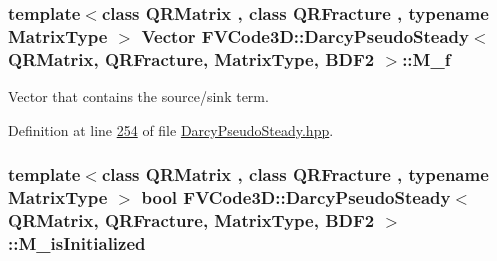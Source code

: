 \subsubsection[{\texorpdfstring{M\+\_\+f}{M_f}}]{\setlength{\rightskip}{0pt plus 5cm}template$<$class Q\+R\+Matrix , class Q\+R\+Fracture , typename Matrix\+Type $>$ {\bf Vector} {\bf F\+V\+Code3\+D\+::\+Darcy\+Pseudo\+Steady}$<$ Q\+R\+Matrix, Q\+R\+Fracture, Matrix\+Type, {\bf B\+D\+F2} $>$\+::M\+\_\+f\hspace{0.3cm}{\ttfamily [protected]}}\hypertarget{classFVCode3D_1_1DarcyPseudoSteady_3_01QRMatrix_00_01QRFracture_00_01MatrixType_00_01BDF2_01_4_a8a75d8bd731f7b15ec65ada8eca3d67e}{}\label{classFVCode3D_1_1DarcyPseudoSteady_3_01QRMatrix_00_01QRFracture_00_01MatrixType_00_01BDF2_01_4_a8a75d8bd731f7b15ec65ada8eca3d67e}


Vector that contains the source/sink term. 



Definition at line \hyperlink{DarcyPseudoSteady_8hpp_source_l00254}{254} of file \hyperlink{DarcyPseudoSteady_8hpp_source}{Darcy\+Pseudo\+Steady.\+hpp}.

\subsubsection[{\texorpdfstring{M\+\_\+is\+Initialized}{M_isInitialized}}]{\setlength{\rightskip}{0pt plus 5cm}template$<$class Q\+R\+Matrix , class Q\+R\+Fracture , typename Matrix\+Type $>$ bool {\bf F\+V\+Code3\+D\+::\+Darcy\+Pseudo\+Steady}$<$ Q\+R\+Matrix, Q\+R\+Fracture, Matrix\+Type, {\bf B\+D\+F2} $>$\+::M\+\_\+is\+Initialized\hspace{0.3cm}{\ttfamily [protected]}}\hypertarget{classFVCode3D_1_1DarcyPseudoSteady_3_01QRMatrix_00_01QRFracture_00_01MatrixType_00_01BDF2_01_4_ad19cc49965227320036c2dfc68a2baef}{}\label{classFVCode3D_1_1DarcyPseudoSteady_3_01QRMatrix_00_01QRFracture_00_01MatrixType_00_01BDF2_01_4_ad19cc49965227320036c2dfc68a2baef}


